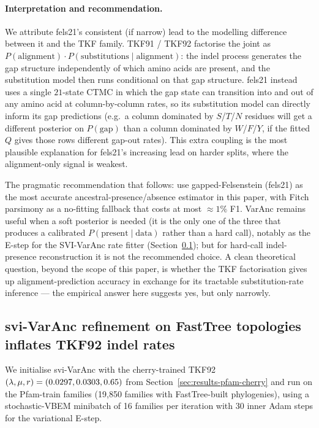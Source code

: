 \paragraph{Interpretation and recommendation.}
We attribute fels21's consistent (if narrow) lead to the
modelling difference between it and the TKF family.  TKF91 /
TKF92 factorise the joint as $P(\text{alignment}) \cdot
P(\text{substitutions} \mid \text{alignment})$: the indel
process generates the gap structure independently of which
amino acids are present, and the substitution model then runs
conditional on that gap structure.  fels21 instead uses a single
$21$-state CTMC in which the gap state can transition into and
out of any amino acid at column-by-column rates, so its
substitution model can directly inform its gap predictions
(e.g.\ a column dominated by $S$/$T$/$N$ residues will get a
different posterior on $P(\text{gap})$ than a column dominated
by $W$/$F$/$Y$, if the fitted $Q$ gives those rows different
gap-out rates).  This extra coupling is the most plausible
explanation for fels21's increasing lead on harder splits, where
the alignment-only signal is weakest.

The pragmatic recommendation that follows: use gapped-Felsenstein
(fels21) as the most accurate ancestral-presence/absence
estimator in this paper, with Fitch parsimony as a no-fitting
fallback that costs at most $\approx 1\%$ F1.  VarAnc remains
useful when a soft posterior is needed (it is the only one of the
three that produces a calibrated $P(\text{present} \mid
\text{data})$ rather than a hard call), notably as the E-step
for the SVI-VarAnc rate fitter
(Section~\ref{sec:results-svi-varanc}); but for hard-call
indel-presence reconstruction it is not the recommended choice.
A clean theoretical question, beyond the scope of this paper, is
whether the TKF factorisation gives up alignment-prediction
accuracy in exchange for its tractable substitution-rate
inference --- the empirical answer here suggests yes, but only
narrowly.

\subsection{svi-VarAnc refinement on FastTree topologies inflates TKF92 indel rates}
\label{sec:results-svi-varanc}

We initialise svi-VarAnc with the cherry-trained TKF92
$(\lambda, \mu, r) = (0.0297, 0.0303, 0.65)$ from
Section~\ref{sec:results-pfam-cherry} and run on the Pfam-train
families (19{,}850 families with FastTree-built phylogenies),
using a stochastic-VBEM minibatch of 16 families per iteration with
30 inner Adam steps for the variational E-step.

